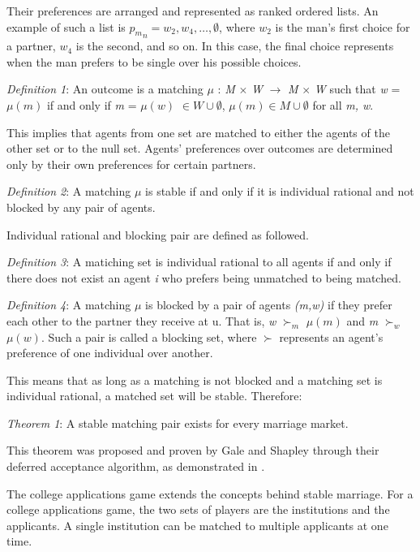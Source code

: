 \documentclass[conference]{IEEEtran}
\begin{document}
Their preferences are arranged and represented as ranked 
ordered lists.  An example of such a list is
\( {p_m}_n ={w_2}, {w_4}, \ldots, \emptyset \),
where \( {w_2} \) is the man's first choice for a partner, 
\( {w_4} \) is the second, and so on.  In this case, the final 
choice represents when the man prefers to be single over 
his possible choices.

\emph{Definition 1}:  An outcome is a matching
 \( \mu \) : \emph{M} \( \times \)  \emph{W} \( \rightarrow \)  \emph{M} \( \times \)  \emph{W} such that
\emph{w} = \( \mu(m) \) if and only if 
\emph{m} = \( \mu(w) \) \( \in W \cup \emptyset \), \( \mu(m) \in M \cup \emptyset \)
for all \emph{m, w}.

This implies that agents from one set are matched to either the agents
of the other set or to the null set.  Agents' preferences over outcomes are
determined only by their own preferences for certain partners.

\emph{Definition 2}:  A matching \( \mu \) is stable if and only if it is individual rational and
not blocked by any pair of agents.

Individual rational and blocking pair are defined as followed.

\emph{Definition 3}:  A matiching set is individual rational to all agents if and only if
there does not exist an agent \emph{i} who prefers being unmatched to being
matched.

\emph{Definition 4}:  A matching \( \mu \) is blocked by a pair of agents \emph{(m,w)} if they
prefer each other to the partner they receive at u.  That is, \emph{w} \(\succ_m \) \( \mu (m) \)
and \emph{m} \(\succ_w \) \( \mu (w) \).  Such a pair is called a blocking set,
where \(\succ \) represents an agent's preference of one individual over another.

This means that as long as a matching is not blocked and a matching set is individual
rational, a matched set will be stable.  Therefore:

\emph{Theorem 1}:  A stable matching pair exists for every marriage market.

This theorem was proposed and proven by Gale and Shapley
through their deferred acceptance algorithm, as demonstrated in \cite{gale_college_1962}.

The college applications game extends the concepts behind stable
marriage.  For a college applications game, the two sets of players are the
institutions and the applicants.  A single institution can be matched to multiple
applicants at one time.
\end{document}
